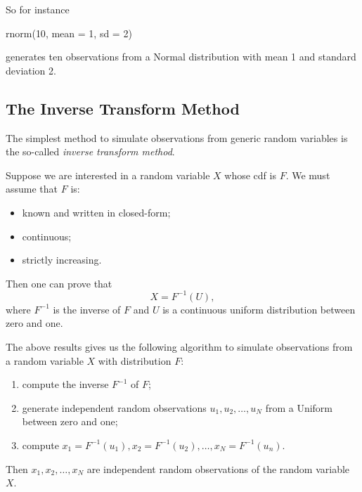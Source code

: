 \documentclass[
]{book}
\newenvironment{Shaded}{\begin{snugshade}}{\end{snugshade}}
\newcommand{\AttributeTok}[1]{\textcolor[rgb]{0.77,0.63,0.00}{#1}}
\newcommand{\DecValTok}[1]{\textcolor[rgb]{0.00,0.00,0.81}{#1}}
\newcommand{\FunctionTok}[1]{\textcolor[rgb]{0.00,0.00,0.00}{#1}}
\newcommand{\NormalTok}[1]{#1}
\begin{document}
So for instance

\begin{Shaded}
\begin{Highlighting}[]
\FunctionTok{rnorm}\NormalTok{(}\DecValTok{10}\NormalTok{, }\AttributeTok{mean =} \DecValTok{1}\NormalTok{, }\AttributeTok{sd =} \DecValTok{2}\NormalTok{)}
\end{Highlighting}
\end{Shaded}

generates ten observations from a Normal distribution with mean 1 and standard deviation 2.

\hypertarget{the-inverse-transform-method}{%
\subsection{The Inverse Transform Method}\label{the-inverse-transform-method}}

The simplest method to simulate observations from generic random variables is the so-called \emph{inverse transform method}.

Suppose we are interested in a random variable \(X\) whose cdf is \(F\). We must assume that \(F\) is:

\begin{itemize}
\item
  known and written in closed-form;
\item
  continuous;
\item
  strictly increasing.
\end{itemize}

Then one can prove that
\[
X = F^{-1}(U),
\]
where \(F^{-1}\) is the inverse of \(F\) and \(U\) is a continuous uniform distribution between zero and one.

The above results gives us the following algorithm to simulate observations from a random variable \(X\) with distribution \(F\):

\begin{enumerate}
\def\labelenumi{\arabic{enumi}.}
\item
  compute the inverse \(F^{-1}\) of \(F\);
\item
  generate independent random observations \(u_1,u_2,\dots,u_N\) from a Uniform between zero and one;
\item
  compute \(x_1=F^{-1}(u_1), x_2=F^{-1}(u_2),\dots,x_N=F^{-1}(u_n)\).
\end{enumerate}

Then \(x_1,x_2,\dots,x_N\) are independent random observations of the random variable \(X\).
\end{document}
